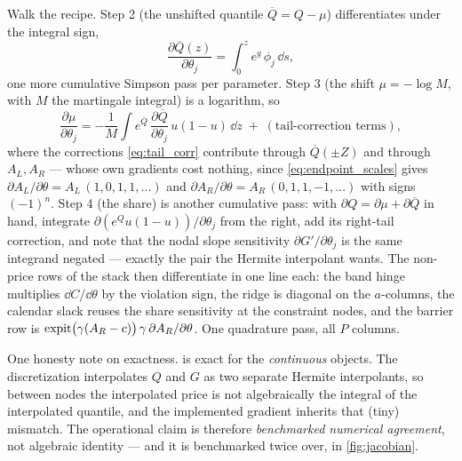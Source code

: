 \documentclass[11pt]{article}
\begin{document}
Walk the recipe.  Step 2 (the unshifted quantile $\overline Q=Q-\mu$)
differentiates under the integral sign,
\begin{equation}
\frac{\partial\overline Q(z)}{\partial\theta_j}
=\int_0^{z}e^{g}\,\phi_j\,\dd s ,
\end{equation}
one more cumulative Simpson pass per parameter.  Step 3 (the shift
$\mu=-\log M$, with $M$ the martingale integral) is a logarithm, so
\begin{equation}
\frac{\partial\mu}{\partial\theta_j}
=-\frac{1}{M}\int e^{\overline Q}\,
\frac{\partial\overline Q}{\partial\theta_j}\,u(1-u)\,\dd z
\;+\;(\text{tail-correction terms}),
\end{equation}
where the corrections \eqref{eq:tail_corr} contribute through
$\overline Q(\pm Z)$ and through $A_L,A_R$ --- whose own gradients cost
nothing, since \eqref{eq:endpoint_scales} gives
$\partial A_L/\partial\theta=A_L\,(1,0,1,1,\dots)$ and
$\partial A_R/\partial\theta=A_R\,(0,1,1,-1,\dots)$ with signs $(-1)^{n}$.
Step 4 (the share) is another cumulative pass: with
$\partial Q=\partial\mu+\partial\overline Q$ in hand, integrate
$\partial(e^{Q}u(1-u))/\partial\theta_j$ from the right, add its right-tail
correction, and note that the nodal slope sensitivity
$\partial G'/\partial\theta_j$ is the same integrand negated --- exactly
the pair the Hermite interpolant wants.  The non-price rows of the stack
then differentiate in one line each: the band hinge multiplies
$\dd C/\dd\theta$ by the violation sign, the ridge is diagonal on the
$a$-columns, the calendar slack reuses the share sensitivity at the
constraint nodes, and the barrier row is
$\operatorname{expit}\!\big(\gamma(A_R-c)\big)\,\gamma\,\partial A_R/\partial\theta$.
One quadrature pass, all $P$ columns.

One honesty note on exactness.   is exact for the
\emph{continuous} objects.  The discretization interpolates $Q$ and $G$ as
two separate Hermite interpolants, so between nodes the interpolated price is
not algebraically the integral of the interpolated quantile, and the
implemented gradient inherits that (tiny) mismatch.  The operational claim is
therefore \emph{benchmarked numerical agreement}, not algebraic identity ---
and it is benchmarked twice over, in \cref{fig:jacobian}.
\end{document}
